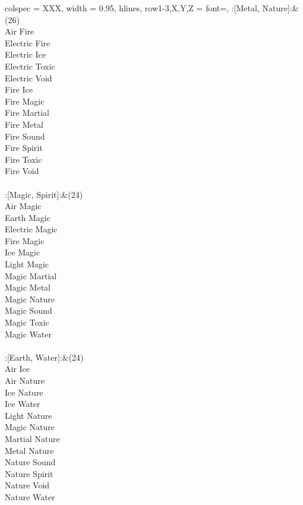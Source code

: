 \begin{longtblr}[
	caption = {2v2 Attacking Ineffective},
	label = {2v2-Attacking-Ineffective},
]{
	colspec = {XXX}, width = 0.95\linewidth,
	hlines,
	row{1-3,X,Y,Z} = {font=\bfseries},
}
	:[Metal, Nature]:&{(26)\\
	Air Fire \\
	Electric Fire \\
	Electric Ice \\
	Electric Toxic \\
	Electric Void \\
	Fire Ice \\
	Fire Magic \\
	Fire Martial \\
	Fire Metal \\
	Fire Sound \\
	Fire Spirit \\
	Fire Toxic \\
	Fire Void \\
	}\\

	:[Magic, Spirit]:&{(24)\\
	Air Magic \\
	Earth Magic \\
	Electric Magic \\
	Fire Magic \\
	Ice Magic \\
	Light Magic \\
	Magic Martial \\
	Magic Metal \\
	Magic Nature \\
	Magic Sound \\
	Magic Toxic \\
	Magic Water \\
	}\\

	:[Earth, Water]:&{(24)\\
	Air Ice \\
	Air Nature \\
	Ice Nature \\
	Ice Water \\
	Light Nature \\
	Magic Nature \\
	Martial Nature \\
	Metal Nature \\
	Nature Sound \\
	Nature Spirit \\
	Nature Void \\
	Nature Water \\
	}\\


\end{longtblr}
